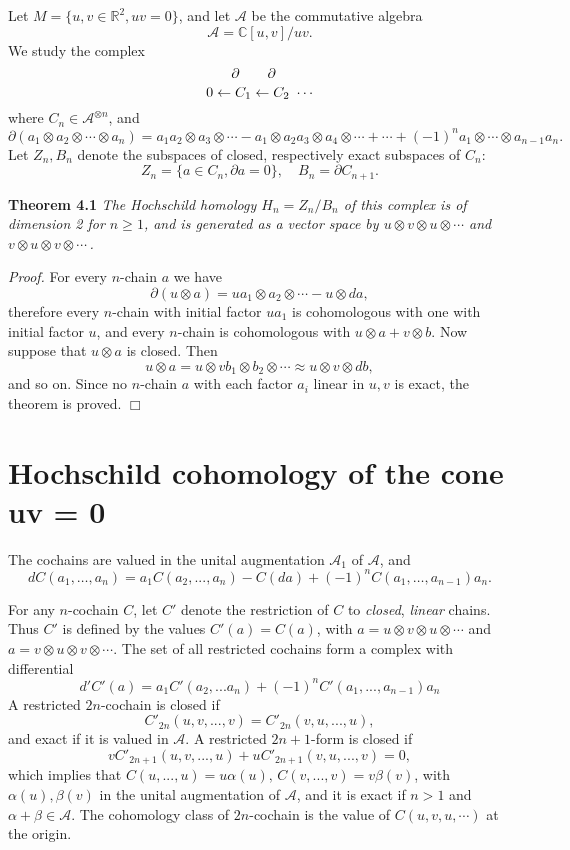 \documentclass[a4paper,a4paper]{article}
\begin{document}
Let $M = \{u,v \in \mathbb{R}^2, uv = 0\}$, and let 
${\mathcal{A}}$ be the commutative algebra
$$
{\mathcal{A}} = \mathbb{C}[u,v]/uv.
$$
We study the complex 
$$
{{\hskip-3mm\partial\hskip7mm\partial}\atop 
{0\leftarrow C_1 \leftarrow C_2\,\,\cdots}}
$$
where $C_n \in   {\mathcal{A}}^{\otimes n} $, and
$$
\partial(a_1\otimes a_2\otimes \cdots \otimes a_n) = a_1a_2\otimes
a_3\otimes \cdots - a_1\otimes a_2a_3\otimes a_4\otimes \cdots +
\cdots +
(-1)^n a_1\otimes \cdots \otimes a_{n-1}a_n.
$$
Let $Z_n,B_n$ denote the subspaces of closed, respectively exact
subspaces of $C_n$:
$$
Z_n = \{ a\in C_n, \partial a = 0\},\quad B_n = \partial C_{n+1}.
$$

\noindent\textbf{Theorem 4.1} \textit{
The  Hochschild homology $H_n = Z_n/B_n$
of this complex is of dimension 2 for $n \geq 1$, and is generated as a
vector space by $u\otimes v\otimes u\otimes \cdots$ and $v\otimes
u\otimes v\otimes \cdots\,$.}

\noindent\textit{Proof.} For every $n$-chain $a$ we have
$$
\partial(u\otimes a) = ua_1\otimes a_2 \otimes \cdots - u\otimes da,
$$
therefore every $n$-chain with initial factor $ua_1$ is cohomologous
with one with initial factor $u$, and every $n$-chain is cohomologous
with $u\otimes a + v\otimes b$. Now suppose that $u\otimes a$ is closed. Then
$$
u\otimes a = u\otimes vb_1\otimes b_2 \otimes \cdots \approx  u 
\otimes v\otimes db,
$$
and so on. Since no $n$-chain $a$ with each factor $a_i$ linear in
$u,v$ is exact, the theorem is proved. \hfill $\Box$


\section{Hochschild cohomology of the cone uv = 0} %

The cochains are valued in the unital augmentation ${\mathcal{A}_1}$ 
of ${\mathcal{A}}$,  and
$$
dC(a_1,\ldots,a_n)= a_1C(a_2,...,a_n) - C(da) +(-1)^nC(a_1,\ldots,a_{n-1})a_n.
$$

For any $n$-cochain $C$, let $C'$ denote the restriction 
of $C$ to \textsl{closed}, \textsl{linear} chains.
Thus $C'$ is defined by the values $C'(a) = C(a)$, with $a = u\otimes v
\otimes u\otimes \cdots$ and $a = v\otimes u\otimes v\otimes \cdots$.
The set of all restricted cochains form a complex with differential
$$
d'C'(a) = a_1C'(a_2,...a_n) + (-1)^nC'(a_1,...,a_{n-1})a_n
$$
A  restricted $2n$-cochain is closed if
$$ 
C'_{2n}(u,v,...,v) = C'_{2n}(v,u,...,u), 
$$
and exact if it is valued in ${\mathcal{A}}$. A restricted $2n+1$-form is
closed if 
$$
  vC'_{2n+1} (u,v,...,u) + uC'_{2n+1}(v,u,...,v) = 0,
$$
which implies that $C(u,...,u) = u\alpha (u),\, C(v,...,v) = v\beta (v)$,
with $\alpha(u), \beta(v)$    in the unital augmentation of ${\mathcal{A}}$,
and it is exact if  $n > 1$ and $\alpha + \beta \in{\mathcal{A}}$. The
cohomology class of $2n$-cochain is  the value of $C(u,v,u, \cdots)$ at
the origin.
\end{document}
